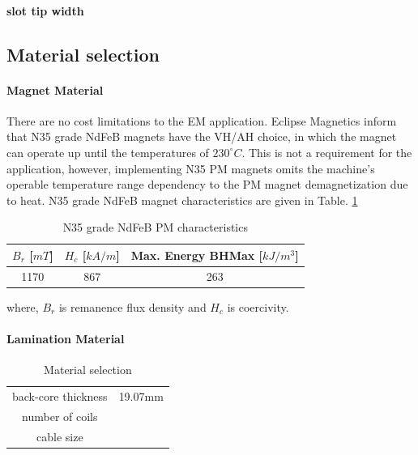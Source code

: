 \documentclass [a4 paper, 11pt, titlepage] {article}
\begin{document}
	\paragraph{slot tip width}
	
	
	
	
	
	
	
	\subsection{Material selection}
	
	\paragraph{Magnet Material} There are no cost limitations to the EM application. Eclipse Magnetics inform that N35 grade NdFeB magnets have the VH/AH choice, in which the magnet can operate up until the temperatures of $230^{\circ}C$. This is not a requirement for the application, however, implementing N35 PM magnets omits the machine's operable temperature range dependency to the PM magnet demagnetization due to heat.
	N35 grade NdFeB magnet characteristics are given in Table. \ref{tab:N35}
	
	\begin{table}[h]
		\begin{center}
			\begin{tabular}{c|c|c}
				$B_r$ [$mT$] & $H_c$ [$kA/m$] & Max. Energy BHMax [$kJ/m^3$] \\
				\hline
				1170 & 867 & 263
			\end{tabular}
		\end{center}
		\caption{N35 grade NdFeB PM characteristics}
		\label{tab:N35}
	\end{table}
	where, $B_r$ is remanence flux density and $H_c$ is coercivity.
	
	\paragraph{Lamination Material}
	
	
	\begin{table}[h]
		\begin{center}
			\begin{tabular}{c|c}
				 &  \\
				\hline
				back-core thickness & 19.07mm \\
				number of coils & \\
				cable size & 
			\end{tabular}
		\end{center}
		\caption{Material selection}
		\label{tab:materialSelection}
	\end{table}
	
\end{document}
